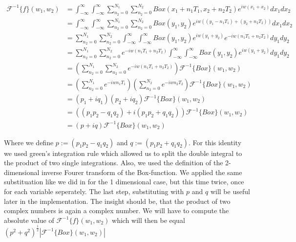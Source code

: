 \begin{align*}
\mathcal{F}^{-1}\{f\}(w_1,w_2)
& = \int_{-\infty}^{\infty}\int_{-\infty}^{\infty} \sum_{n_2=0}^{N_1} \sum_{n_2=0}^{N_2} Box(x_1 + n_1 T_1, x_2 + n_2 T_2) e^{iw(x_1 + x_2)}dx_1 dx_2 \\
& = \int_{-\infty}^{\infty}\int_{-\infty}^{\infty} \sum_{n_2=0}^{N_1} \sum_{n_2=0}^{N_2} Box(y_1, y_2) e^{iw((y_1 - n_1 T_1) + (y_2 + n_2 T_2))}dx_1 dx_2 \\
& =\sum_{n_2=0}^{N_1} \sum_{n_2=0}^{N_2} \int_{-\infty}^{\infty}\int_{-\infty}^{\infty} Box(y_1, y_2) e^{iw(y_1 + y_2)} e^{-iw(n_1 T_1 + n_2 T_2)}dy_1 dy_2 \\
& =\sum_{n_2=0}^{N_1} \sum_{n_2=0}^{N_2} e^{-iw(n_1 T_1 + n_2 T_2)} \int_{-\infty}^{\infty}\int_{-\infty}^{\infty} Box(y_1, y_2) e^{iw(y_1 + y_2)} dy_1 dy_2 \\
& =\left(\sum_{n_2=0}^{N_1} \sum_{n_2=0}^{N_2} e^{-iw(n_1 T_1 + n_2 T_2)}\right) \mathcal{F}^{-1}\{Box\}(w_1,w_2) \\
& =\left(\sum_{n_2=0}^{N_1} e^{-iw n_1 T_1}\right) \left(\sum_{n_2=0}^{N_2} e^{-iw n_2 T_2}\right) \mathcal{F}^{-1}\{Box\}(w_1,w_2) \\
& =(p_1 + i q_1)(p_2 + i q_2) \mathcal{F}^{-1}\{Box\}(w_1,w_2) \\
& =((p_1 p_2 - q_1 q_2) + i(p_1 p_2 + q_1 q_2)) \mathcal{F}^{-1}\{Box\}(w_1,w_2) \\
& =(p + iq) \mathcal{F}^{-1}\{Box\}(w_1,w_2)
\end{align*}

Where we define $p := (p_1 p_2 - q_1 q_2) $ and $q := (p_1 p_2 + q_1 q_2)$. For this identity we used green's integration rule which allowed us to split the double integral to the product of two single integrations. Also, we used the definition of the 2-dimensional inverse Fourer transform of the Box-function. We applied the same substituation like we did in for the 1 dimensional case, but this time twice, once for each variable seperately. The last step, substituting with $p$ and $q$ will be useful later in the implementation. The insight should be, that the product of two complex numbers is again a complex number. We will have to compute the absolute value of $\mathcal{F}^{-1}\{f\}(w_1,w_2)$ which will then be equal $(p^2 + q^2)^{\frac{1}{2}}\left|\mathcal{F}^{-1}\{Box\}(w_1,w_2)\right|$
